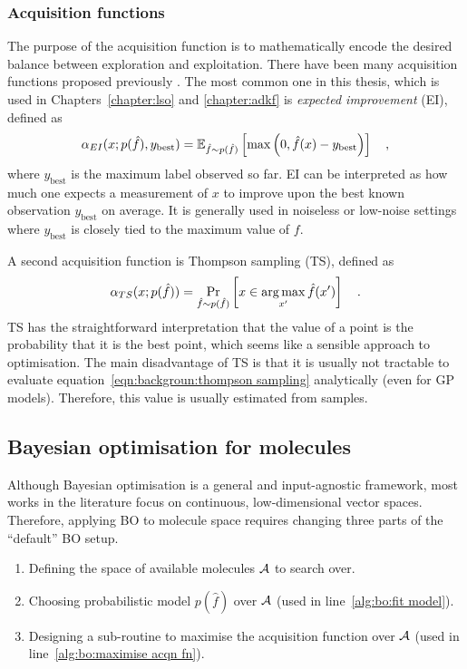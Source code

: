 \subsubsection{Acquisition functions}

The purpose of the acquisition function is to mathematically encode the desired balance between exploration and exploitation.
There have been many acquisition functions proposed previously
\citep[chapter 7]{garnett_bayesoptbook_2023}.
The most common one in this thesis, which is used in Chapters~\ref{chapter:lso} and \ref{chapter:adkf} is
\emph{expected improvement} (EI), defined as
\begin{equation}\label{eqn:expected-improvement}
    \alpha_{EI}(x;p(\hat f), y_{\text{best}}) = \mathbb{E}_{\hat f\sim p(\hat f)}\left[
        \max\left(
            0,
            \hat f(x) - y_{\text{best}}
        \right)
    \right] \quad ,
\end{equation}
where $y_{\text{best}}$ is the maximum label observed so far.
EI can be interpreted as how much one expects a measurement of $x$ to improve upon
the best known observation $y_{\text{best}}$ on average.
It is generally used in noiseless or low-noise settings where $y_{\text{best}}$
is closely tied to the maximum value of $f$.

A second acquisition function is Thompson sampling (TS),
defined as
\begin{equation}\label{eqn:backgroun:thompson sampling}
    \alpha_{TS}(x;p(\hat f)) = \Pr_{\hat f\sim p(\hat f)}\left[
        x\in\operatorname*{arg\,max}_{x'} \hat f(x')
    \right] \quad .
\end{equation}
TS has the straightforward interpretation that the value of a point is the probability that it is the best point,
which seems like a sensible approach to optimisation.
The main disadvantage of TS is that it is usually not tractable to evaluate 
equation~\ref{eqn:backgroun:thompson sampling} analytically
(even for GP models).
Therefore, this value is usually estimated from samples.

\subsection{Bayesian optimisation for molecules}

Although Bayesian optimisation is a general and input-agnostic framework,
most works in the literature focus on continuous, low-dimensional vector spaces.
Therefore, applying BO to molecule space requires changing three
parts of the ``default'' BO setup.
\begin{enumerate}
    \item Defining the space of available molecules $\mathcal{A}$ to search over.
    \item Choosing  probabilistic model $p(\hat f)$ over $\mathcal{A}$ (used in line~\ref{alg:bo:fit model}).
    \item Designing a sub-routine to maximise the acquisition function over $\mathcal{A}$
        (used in line~\ref{alg:bo:maximise acqn fn}).
\end{enumerate}


